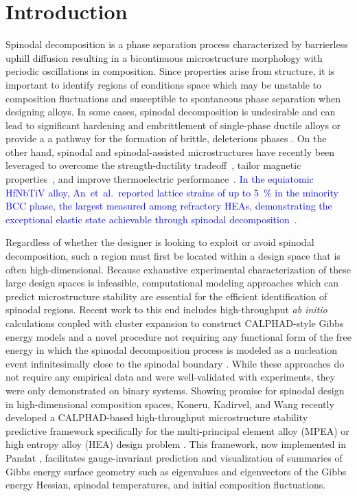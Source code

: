 \section{Introduction}

Spinodal decomposition is a phase separation process characterized by barrierless uphill diffusion resulting in a bicontinuous microstructure morphology with periodic oscillations in composition. Since properties arise from structure, it is important to identify regions of conditions space which may be unstable to composition fluctuations and susceptible to spontaneous phase separation when designing alloys. In some cases, spinodal decomposition is undesirable and can lead to significant hardening and embrittlement of single-phase ductile alloys \cite{wang2023spinodal} or provide a a pathway for the formation of brittle, deleterious phases \cite{dasari2023crystallographic}. On the other hand, spinodal and spinodal-assisted microstructures have recently been leveraged to overcome the strength-ductility tradeoff~\cite{an2021spinodal,lee2025spinodal,zhang2022refinement}, tailor magnetic properties~\cite{rao2021beyond,dong2024cooperative}, and improve thermoelectric performance~\cite{duan2025spinodal}. \textcolor{blue}{In the equiatomic HfNbTiV alloy, An~et~al.\ reported lattice strains of up to \SI{5}{\percent} in the minority BCC phase, the largest measured among refractory HEAs, demonstrating the exceptional elastic state achievable through spinodal decomposition~\cite{an2021spinodal}.} 

Regardless of whether the designer is looking to exploit or avoid spinodal decomposition, such a region must first be located within a design space that is often high-dimensional. Because exhaustive experimental characterization of these large design spaces is infeasible, computational modeling approaches which can predict microstructure stability are essential for the efficient identification of spinodal regions. Recent work to this end includes high-throughput \textit{ab initio} calculations coupled with cluster expansion to construct CALPHAD-style Gibbs energy models \cite{usanmaz2016first} and a novel procedure not requiring any functional form of the free energy in which the spinodal decomposition process is modeled as a nucleation event infinitesimally close to the spinodal boundary \cite{divilov2024priori}. While these approaches do not require any empirical data and were well-validated with experiments, they were only demonstrated on binary systems. Showing promise for spinodal design in high-dimensional composition spaces, Koneru, Kadirvel, and Wang recently developed a CALPHAD-based high-throughput microstructure stability predictive framework specifically for the multi-principal element alloy (MPEA) or high entropy alloy (HEA) design problem \cite{koneru2022high,kadirvel2022exploration}. This framework, now implemented in Pandat \cite{cao2009pandat}, facilitates gauge-invariant prediction and visualization of summaries of Gibbs energy surface geometry such as eigenvalues and eigenvectors of the Gibbs energy Hessian, spinodal temperatures, and initial composition fluctuations. 



